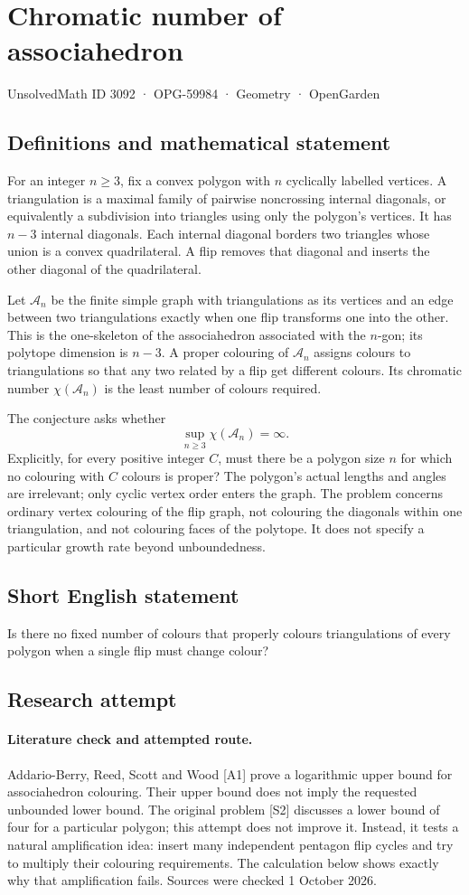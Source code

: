 \documentclass[11pt,a4paper]{article}
\begin{document}
\section*{Chromatic number of associahedron}\label{3092}
{\small UnsolvedMath ID 3092 · OPG-59984 · Geometry · OpenGarden}
\subsection{Definitions and mathematical statement}
For an integer $n\ge3$, fix a convex polygon with $n$ cyclically labelled
vertices. A triangulation is a maximal family of pairwise noncrossing
internal diagonals, or equivalently a subdivision into triangles using
only the polygon's vertices. It has $n-3$ internal diagonals.
Each internal diagonal borders two triangles whose union is a convex
quadrilateral. A flip removes that diagonal and inserts the other diagonal
of the quadrilateral.

Let $\mathcal A_n$ be the finite simple graph with triangulations as its
vertices and an edge between two triangulations exactly when one flip
transforms one into the other. This is the one-skeleton of the associahedron
associated with the $n$-gon; its polytope dimension is $n-3$.
A proper colouring of $\mathcal A_n$ assigns colours to triangulations
so that any two related by a flip get different colours. Its chromatic
number $\chi(\mathcal A_n)$ is the least number of colours required.

The conjecture asks whether
\[
 \sup_{n\ge3}\chi(\mathcal A_n)=\infty.
\]
Explicitly, for every positive integer $C$, must there be a polygon size
$n$ for which no colouring with $C$ colours is proper? The polygon's
actual lengths and angles are irrelevant; only cyclic vertex order
enters the graph. The problem concerns ordinary vertex colouring of the
flip graph, not colouring the diagonals within one triangulation, and
not colouring faces of the polytope. It does not specify a particular
growth rate beyond unboundedness.
\subsection{Short English statement}
Is there no fixed number of colours that properly colours triangulations of every polygon when a single flip must change colour?
\subsection{Research attempt}
\paragraph{Literature check and attempted route.}
Addario-Berry, Reed, Scott and Wood [A1] prove a logarithmic upper bound for
associahedron colouring. Their upper bound does not imply the requested
unbounded lower bound. The original problem [S2] discusses a lower bound of
four for a particular polygon; this attempt does not improve it. Instead,
it tests a natural amplification idea: insert many independent pentagon flip
cycles and try to multiply their colouring requirements. The calculation below
shows exactly why that amplification fails. Sources were checked 1 October 2026.
\end{document}
